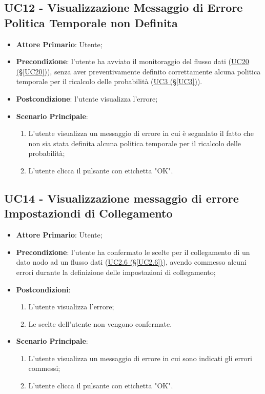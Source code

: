 \pagebreak

\subsection{UC12 - Visualizzazione Messaggio di Errore Politica Temporale non Definita}\label{UC12}
\begin{itemize}
\item \textbf{Attore Primario}: Utente;
\item \textbf{Precondizione}: l'utente ha avviato il monitoraggio del flusso dati (\hyperref[UC20]{UC20 							(§\ref*{UC20})}), senza aver preventivamente definito correttamente alcuna politica temporale per il ricalcolo delle probabilità (\hyperref[UC3]{UC3 (§\ref*{UC3})}).
\item \textbf{Postcondizione}: l'utente visualizza l'errore;
\item \textbf{Scenario Principale}:
	\begin{enumerate}
	\item L'utente visualizza un messaggio di errore in cui è segnalato il fatto che non sia stata definita alcuna 				politica temporale per il ricalcolo delle probabilità;
	\item L'utente clicca il pulsante con etichetta "OK".
	\end{enumerate}
\end{itemize}

\newpage

\subsection{UC14 - Visualizzazione messaggio di errore Impostaziondi di Collegamento}\label{UC14}
\begin{itemize}
\item \textbf{Attore Primario}: Utente;
\item \textbf{Precondizione}: l'utente ha confermato le scelte per il collegamento di un dato nodo ad un flusso dati (\hyperref[UC2.6]{UC2.6 (§\ref*{UC2.6})}), avendo commesso alcuni errori durante la definizione delle impostazioni di collegamento;
\item \textbf{Postcondizioni}:
	\begin{enumerate}
	\item L'utente visualizza l'errore;
	\item Le scelte dell'utente non vengono confermate.
	\end{enumerate}
\item \textbf{Scenario Principale}:
	\begin{enumerate}
	\item L'utente visualizza un messaggio di errore in cui sono indicati gli errori commessi;
	\item L'utente clicca il pulsante con etichetta "OK".
	\end{enumerate}
\end{itemize}

